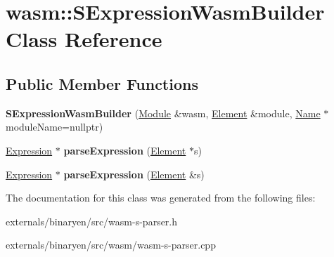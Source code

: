 \hypertarget{classwasm_1_1_s_expression_wasm_builder}{}\section{wasm\+:\+:S\+Expression\+Wasm\+Builder Class Reference}
\label{classwasm_1_1_s_expression_wasm_builder}
\subsection*{Public Member Functions}
\begin{DoxyCompactItemize}
\item 
\mbox{\label{classwasm_1_1_s_expression_wasm_builder_a0970068469d244324b4e103deed31913}} 
{\bfseries S\+Expression\+Wasm\+Builder} (\mbox{\hyperlink{classwasm_1_1_module}{Module}} \&wasm, \mbox{\hyperlink{classwasm_1_1_element}{Element}} \&module, \mbox{\hyperlink{structwasm_1_1_name}{Name}} $\ast$module\+Name=nullptr)
\item 
\mbox{\label{classwasm_1_1_s_expression_wasm_builder_aa1e9e3e25728491f08fd1e5bee1f4d7a}} 
\mbox{\hyperlink{classwasm_1_1_expression}{Expression}} $\ast$ {\bfseries parse\+Expression} (\mbox{\hyperlink{classwasm_1_1_element}{Element}} $\ast$s)
\item 
\mbox{\label{classwasm_1_1_s_expression_wasm_builder_a7f78c3597fccc3fcad354672ddaa7728}} 
\mbox{\hyperlink{classwasm_1_1_expression}{Expression}} $\ast$ {\bfseries parse\+Expression} (\mbox{\hyperlink{classwasm_1_1_element}{Element}} \&s)
\end{DoxyCompactItemize}


The documentation for this class was generated from the following files\+:\begin{DoxyCompactItemize}
\item 
externals/binaryen/src/wasm-\/s-\/parser.\+h\item 
externals/binaryen/src/wasm/wasm-\/s-\/parser.\+cpp\end{DoxyCompactItemize}
